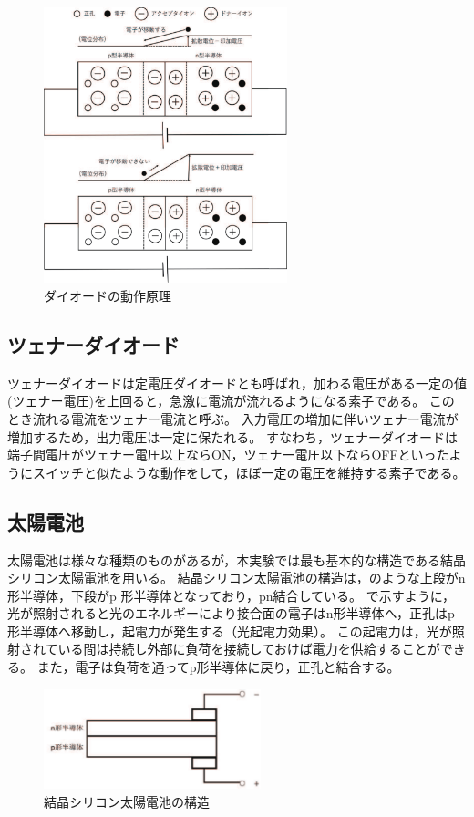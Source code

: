 \begin{figure}[!t]
 \centering
 \includegraphics[height=8.0cm]{./pdfs/fig2.pdf}
 \caption{ダイオードの動作原理}
 \label{fig:fig2}
\end{figure}%

\subsection{ツェナーダイオード}
ツェナーダイオードは定電圧ダイオードとも呼ばれ，加わる電圧がある一定の値(ツェナー電圧)を上回ると，急激に電流が流れるようになる素子である。
このとき流れる電流をツェナー電流と呼ぶ。
入力電圧の増加に伴いツェナー電流が増加するため，出力電圧は一定に保たれる。
すなわち，ツェナーダイオードは端子間電圧がツェナー電圧以上ならON，ツェナー電圧以下ならOFFといったようにスイッチと似たような動作をして，ほぼ一定の電圧を維持する素子である。

\subsection{太陽電池}
太陽電池は様々な種類のものがあるが，本実験では最も基本的な構造である結晶シリコン太陽電池を用いる。
結晶シリコン太陽電池の構造は，のような上段がn 形半導体，下段がp 形半導体となっており，pn結合している。
で示すように，光が照射されると光のエネルギーにより接合面の電子はn形半導体へ，正孔はp形半導体へ移動し，起電力が発生する（光起電力効果）。
この起電力は，光が照射されている間は持続し外部に負荷を接続しておけば電力を供給することができる。
また，電子は負荷を通ってp形半導体に戻り，正孔と結合する。
\begin{figure}[htb]
	\centering
	\includegraphics[width=6.3cm]{./pdfs/fig3.pdf}
	\caption{結晶シリコン太陽電池の構造}
	\label{fig:fig3}
\end{figure}

